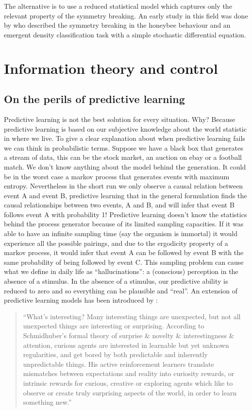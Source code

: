 The alternative is to use a reduced statistical model which captures
only the relevant property of the symmetry breaking.
An early study in this field was done by \citet{Hamann2010:modelsimmetry} who described
the symmetry breaking in the honeybee behaviour and an emergent
density classification task with a simple stochastic differential equation.

\section{Information theory and control \label{Conclusion:Thoughts}}


\subsection{On the perils of predictive learning}
Predictive learning is not the best solution for every situation. Why?
Because predictive learning is based on our subjective knowledge about the
world statistic in where we live. To give a clear explanation about when predictive
 learning fails we can think in probabilistic terms. Suppose we have a black box
that generates a stream of data, this can be the stock market, an auction on ebay
 or a football match. We don't know anything about the model behind the generation.
It could be in the worst case a markov process that generates events with maximum
 entropy. Nevertheless in the short run we only observe a causal relation between
 event A and event B, predictive learning that in the general formulation finds
the causal relationships between two events, A and B, and will infer that event B follows
 event A with probability 1! Predictive learning doesn't know the statistics behind
 the process generator because of its limited sampling capacities. If it was able
 to have an infinite sampling time (say the organism is immortal) it would experience
 all the possible pairings, and due to the ergodicity property of a markov process,
 it would infer that event A can be followed by event B with the same probability
 of being followed by event C.
This sampling problem can cause what we define in daily life as “hallucinations”:
a (conscious) perception in the absence of a stimulus.
In the absence of a stimulus, our predictive ability is reduced to zero and so everything
can be plausible and ``real''.
An extension of predictive learning models has been introduced by \citet{Schuber2010:Novelty}:
\begin{quotation}
``What's interesting? Many interesting things are unexpected, but not all unexpected
things are interesting or surprising. According to Schmidhuber's formal theory of
surprise \& novelty \& interestingness \& attention, curious agents are interested
in learnable but yet unknown regularities, and get bored by both predictable and
 inherently unpredictable things. His active reinforcement learners translate
mismatches between expectations and reality into curiosity rewards, or intrinsic
rewards for curious, creative or exploring agents which like to observe or create
truly surprising aspects of the world, in order to learn something new.''
\end{quotation}


